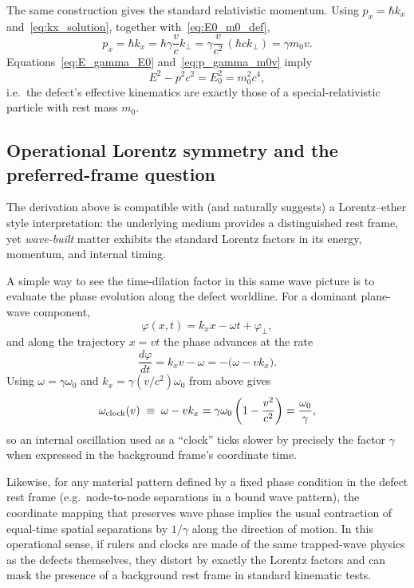 \documentclass[11pt]{article}
\begin{document}
The same construction gives the standard relativistic momentum. Using $p_x=\hbar k_x$ and~\eqref{eq:kx_solution}, together with~\eqref{eq:E0_m0_def},
\begin{equation}
p_x = \hbar k_x
= \hbar\gamma\frac{v}{c}k_\perp
= \gamma\frac{v}{c^2}\,(\hbar c k_\perp)
= \gamma m_0 v.
\label{eq:p_gamma_m0v}
\end{equation}
Equations~\eqref{eq:E_gamma_E0} and~\eqref{eq:p_gamma_m0v} imply
\begin{equation}
E^2 - p^2c^2 = E_0^2 = m_0^2c^4,
\end{equation}
i.e.\ the defect's effective kinematics are exactly those of a special-relativistic particle with rest mass $m_0$.

\subsection{Operational Lorentz symmetry and the preferred-frame question}

The derivation above is compatible with (and naturally suggests) a Lorentz--ether style interpretation: the underlying medium provides a distinguished rest frame, yet \emph{wave-built} matter exhibits the standard Lorentz factors in its energy, momentum, and internal timing.

A simple way to see the time-dilation factor in this same wave picture is to evaluate the phase evolution along the defect worldline. For a dominant plane-wave component,
\begin{equation}
\varphi(x,t) = k_x x - \omega t + \varphi_\perp,
\end{equation}
and along the trajectory $x=vt$ the phase advances at the rate
\begin{equation}
\frac{d\varphi}{dt} = k_x v - \omega
= -\big(\omega - v k_x\big).
\end{equation}
Using $\omega=\gamma\omega_0$ and $k_x=\gamma(v/c^2)\omega_0$ from above gives
\begin{equation}
\omega_{\rm clock}(v) \;\equiv\; \omega - v k_x
= \gamma\omega_0\left(1-\frac{v^2}{c^2}\right)
= \frac{\omega_0}{\gamma},
\label{eq:time_dilation_from_phase}
\end{equation}
so an internal oscillation used as a ``clock'' ticks slower by precisely the factor $\gamma$ when expressed in the background frame's coordinate time.

Likewise, for any material pattern defined by a fixed phase condition in the defect rest frame (e.g.\ node-to-node separations in a bound wave pattern), the coordinate mapping that preserves wave phase implies the usual contraction of equal-time spatial separations by $1/\gamma$ along the direction of motion. In this operational sense, if rulers and clocks are made of the same trapped-wave physics as the defects themselves, they distort by exactly the Lorentz factors and can mask the presence of a background rest frame in standard kinematic tests.
\end{document}
